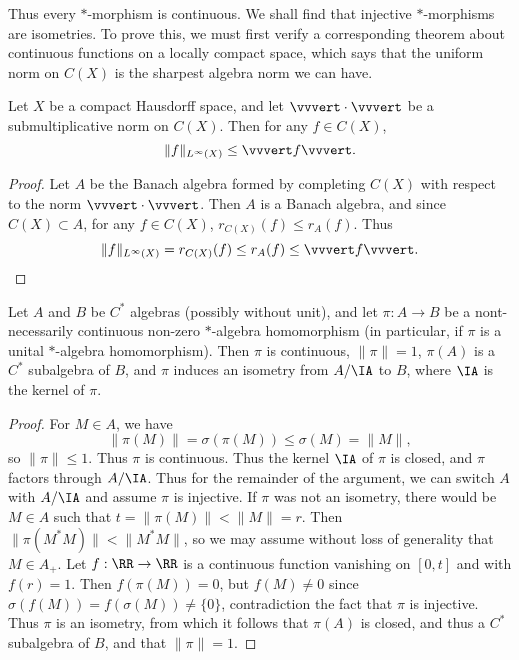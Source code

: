 Thus every $*$-morphism is continuous. We shall find that injective $*$-morphisms are isometries. To prove this, we must first verify a corresponding theorem about continuous functions on a locally compact space, which says that the uniform norm on $C(X)$ is the sharpest algebra norm we can have.

\begin{lemma}
    Let $X$ be a compact Hausdorff space, and let $\vvvert \cdot \vvvert$ be a submultiplicative norm on $C(X)$. Then for any $f \in C(X)$,
    \[ \| f \|_{L^\infty(X)} \leq \vvvert f \vvvert. \]
\end{lemma}
\begin{proof}
    Let $A$ be the Banach algebra formed by completing $C(X)$ with respect to the norm $\vvvert \cdot \vvvert$. Then $A$ is a Banach algebra, and since $C(X) \subset A$, for any $f \in C(X)$, $r_{C(X)}(f) \leq r_A(f)$. Thus
    \[ \| f \|_{L^\infty(X)} = r_{C(X)}(f) \leq r_A(f) \leq \vvvert f \vvvert. \qedhere \]
\end{proof}

\begin{lemma}
    Let $A$ and $B$ be $C^*$ algebras (possibly without unit), and let $\pi: A \to B$ be a nont-necessarily continuous non-zero $*$-algebra homomorphism (in particular, if $\pi$ is a unital $*$-algebra homomorphism). Then $\pi$ is continuous, $\| \pi \| = 1$, $\pi(A)$ is a $C^*$ subalgebra of $B$, and $\pi$ induces an isometry from $A/\IA$ to $B$, where $\IA$ is the kernel of $\pi$.
\end{lemma}
\begin{proof}
    For $M \in A$, we have
    \[ \| \pi(M) \| = \sigma(\pi(M)) \leq \sigma(M) = \| M \|, \]
    so $\| \pi \| \leq 1$. Thus $\pi$ is continuous. Thus the kernel $\IA$ of $\pi$ is closed, and $\pi$ factors through $A/\IA$. Thus for the remainder of the argument, we can switch $A$ with $A / \IA$ and assume $\pi$ is injective. If $\pi$ was not an isometry, there would be $M \in A$ such that $t = \| \pi(M) \| < \| M \| = r$. Then $\| \pi(M^*M) \| < \| M^*M \|$, so we may assume without loss of generality that $M \in A_+$. Let $f: \RR \to \RR$ is a continuous function vanishing on $[0, t]$ and with $f(r) = 1$. Then $f(\pi(M)) = 0$, but $f(M) \neq 0$ since $\sigma(f(M)) = f(\sigma(M)) \neq \{ 0 \}$, contradiction the fact that $\pi$ is injective. Thus $\pi$ is an isometry, from which it follows that $\pi(A)$ is closed, and thus a $C^*$ subalgebra of $B$, and that $\| \pi \| = 1$.
\end{proof}

